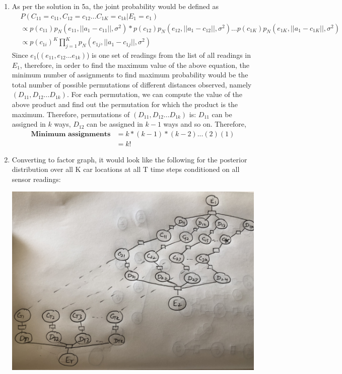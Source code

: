 \documentclass[12pt]{article}
\begin{document}
\begin{enumerate}[label=(\alph*)]
\begin{center}
  \end{center}
  \item As per the solution in 5a, the joint probability would be defined as
  \begin{align*}
  &P (C_{11} = c_{11}, C_{12} = c_{12} ... C_{1K} = c_{1k} | E_1 = e_1) \\ &\propto p(c_{11})p_N (e_{11}, || a_1 - c_{11} ||, \sigma^2) * p(c_{12})p_N (e_{12}, || a_1 - c_{12} ||, \sigma^2) ... p(c_{1K}) p_N (e_{1K}, || a_1 - c_{1K} ||, \sigma^2) \\
& \propto p(c_{1i})^K \prod_{j=1}^{K} p_N(e_{1j}, || a_1 - c_{1j} ||, \sigma^2)
  \end{align*}
  Since $e_1$($(e_{11}, e_{12} ... e_{1k})$) is one set of readings from the list of all readings in $E_1$, therefore, in order to find the maximum value of the above equation, the minimum number of assignments to find maximum probability would be the total number of possible permutations of different distances observed, namely $(D_{11}, D_{12} ... D_{1k})$. For each permutation, we can compute the value of the above product and find out the permutation for which the product is the maximum. Therefore, permutations of $(D_{11}, D_{12} ... D_{1k})$ is: $D_{11}$ can be assigned in $k$ ways, $D_{12}$ can be assigned in $k-1$ ways and so on. Therefore, 
  \begin{align*}
  \textbf{Minimum assignments} &= k * (k-1) * (k-2) ... (2) (1) \\
  &= k!
\end{align*}
\item Converting to factor graph, it would look like the following for the posterior distribution over all K car locations at all T time steps conditioned on all sensor readings:
  \begin{center}
  \includegraphics[scale=0.1]{IMG_2298}

\end{center}
\end{enumerate}
\end{document}
